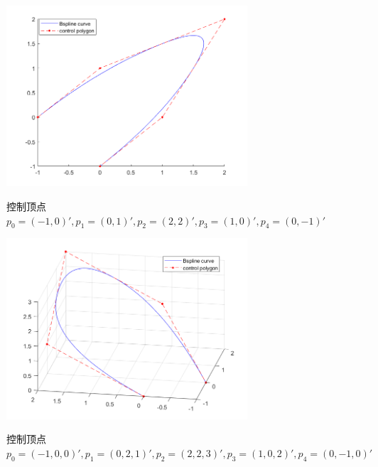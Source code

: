 \documentclass[utf8]{ctexart}
\begin{document}
\begin{itemize}
    \begin{figure}[H]
        \centering
        \includegraphics[width=0.8\textwidth]{bspline_2d_2.png}
        \label{fig: bspline_2d_2}
        \caption{控制顶点
        $p_0=(-1,0)', p_1=(0,1)', p_2=(2,2)', p_3=(1,0)', p_4=(0,-1)'$}
    \end{figure}
    \begin{figure}[H]
        \centering
        \includegraphics[width=0.8\textwidth]{bspline_3d_2.png}
        \label{fig: bspline_3d_2}
        \caption{控制顶点
        $p_0=(-1,0,0)', p_1=(0,2,1)', p_2=(2,2,3)', p_3=(1,0,2)', p_4=(0,-1,0)'$}
    \end{figure}
\end{itemize}
\end{document}
